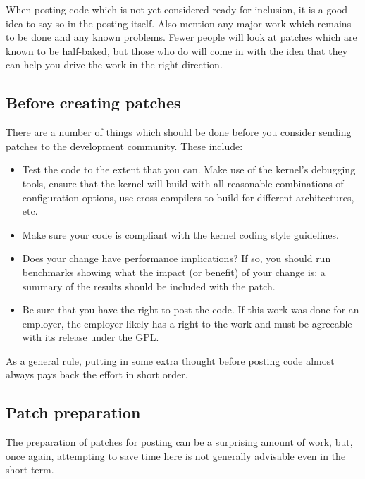 \documentclass[a4paper,8pt,english]{sphinxmanual}
\begin{document}
When posting code which is not yet considered ready for inclusion, it is a
good idea to say so in the posting itself.  Also mention any major work
which remains to be done and any known problems.  Fewer people will look at
patches which are known to be half-baked, but those who do will come in
with the idea that they can help you drive the work in the right direction.


\subsection{Before creating patches}
\label{process/5.Posting:before-creating-patches}
There are a number of things which should be done before you consider
sending patches to the development community.  These include:
\begin{itemize}
\item {} 
Test the code to the extent that you can.  Make use of the kernel's
debugging tools, ensure that the kernel will build with all reasonable
combinations of configuration options, use cross-compilers to build for
different architectures, etc.

\item {} 
Make sure your code is compliant with the kernel coding style
guidelines.

\item {} 
Does your change have performance implications?  If so, you should run
benchmarks showing what the impact (or benefit) of your change is; a
summary of the results should be included with the patch.

\item {} 
Be sure that you have the right to post the code.  If this work was done
for an employer, the employer likely has a right to the work and must be
agreeable with its release under the GPL.

\end{itemize}

As a general rule, putting in some extra thought before posting code almost
always pays back the effort in short order.


\subsection{Patch preparation}
\label{process/5.Posting:patch-preparation}
The preparation of patches for posting can be a surprising amount of work,
but, once again, attempting to save time here is not generally advisable
even in the short term.
\end{document}
